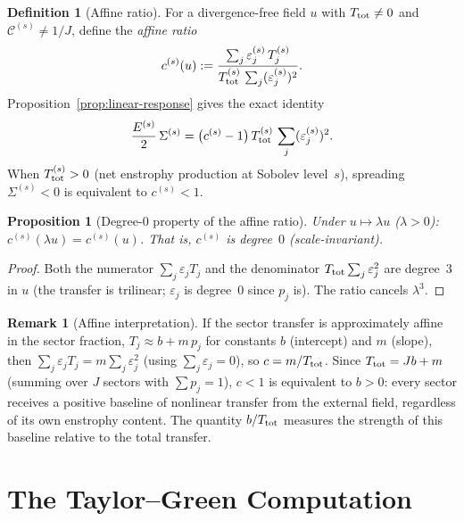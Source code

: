 \documentclass[11pt]{article}
\newtheorem{proposition}[theorem]{Proposition}
\theoremstyle{definition}
\newtheorem{definition}[theorem]{Definition}
\newtheorem{remark}[theorem]{Remark}
\newcommand{\cC}{\mathcal{C}}
\begin{document}
\begin{definition}[Affine ratio]
\label{def:affine-ratio}
For a divergence-free field $u$ with $T_{\rm tot}\neq 0$
and $\cC^{(s)}\neq 1/J$, define the \emph{affine ratio}
\begin{equation}\label{eq:affine-ratio}
c^{(s)}(u) := \frac{\sum_j \varepsilon_j^{(s)}\, T_j^{(s)}}
{T_{\rm tot}^{(s)}\,\sum_j (\varepsilon_j^{(s)})^2}.
\end{equation}
Proposition~\ref{prop:linear-response} gives the exact identity
\begin{equation}\label{eq:Sigma-via-c}
\frac{E^{(s)}}{2}\,\Sigma^{(s)}
= \bigl(c^{(s)} - 1\bigr)\,T_{\rm tot}^{(s)}\,
\sum_j(\varepsilon_j^{(s)})^2.
\end{equation}
When $T_{\rm tot}^{(s)}>0$ (net enstrophy production
at Sobolev level~$s$), spreading $\Sigma^{(s)}<0$ is
equivalent to $c^{(s)}<1$.
\end{definition}

\begin{proposition}[Degree-0 property of the affine ratio]
\label{prop:c-degree-zero}
Under $u\mapsto\lambda u$ ($\lambda>0$):
$c^{(s)}(\lambda u) = c^{(s)}(u)$.
That is, $c^{(s)}$ is degree~$0$ (scale-invariant).
\end{proposition}

\begin{proof}
Both the numerator $\sum_j\varepsilon_j T_j$ and the
denominator $T_{\rm tot}\sum_j\varepsilon_j^2$ are
degree~$3$ in $u$ (the transfer is trilinear;
$\varepsilon_j$ is degree~$0$ since $p_j$ is).
The ratio cancels $\lambda^3$.
\end{proof}

\begin{remark}[Affine interpretation]
\label{rem:affine-interp}
If the sector transfer is approximately affine in the
sector fraction, $T_j \approx b + m\,p_j$ for
constants $b$ (intercept) and $m$ (slope), then
$\sum_j\varepsilon_j T_j = m\sum_j\varepsilon_j^2$
(using $\sum_j\varepsilon_j=0$), so $c = m/T_{\rm tot}$.
Since $T_{\rm tot} = Jb + m$ (summing over $J$ sectors
with $\sum p_j = 1$), $c<1$ is equivalent to $b>0$:
every sector receives a positive baseline of nonlinear
transfer from the external field, regardless of its own
enstrophy content.  The quantity $b/T_{\rm tot}$
measures the strength of this baseline relative to the
total transfer.
\end{remark}

\section{The Taylor--Green Computation}
\label{sec:TG}
\end{document}
